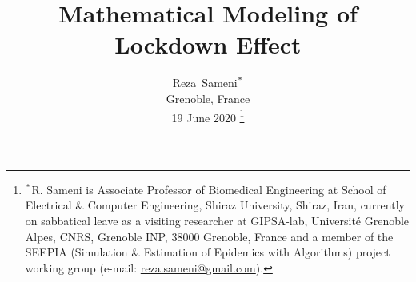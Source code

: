 \documentclass[journal,a4paper,twocolumn]{IEEEtran}
\theoremstyle{definition}
\begin{document}

\title{Mathematical Modeling of Lockdown Effect}
\author{Reza~Sameni$^\textnormal{*}$\\Grenoble, France\\%
19 June 2020%
\thanks{$^\textnormal{*}$R. Sameni is Associate Professor of Biomedical Engineering at School of Electrical \& Computer Engineering, Shiraz University, Shiraz, Iran, currently on sabbatical leave as a visiting researcher at GIPSA-lab, Universit\'e Grenoble Alpes, CNRS, Grenoble INP, 38000 Grenoble, France and a member of the 
SEEPIA (Simulation \& Estimation of Epidemics with Algorithms) project working group (e-mail: \url{reza.sameni@gmail.com}).}%
}%
\markboth{}{}
\maketitle
\end{document}
